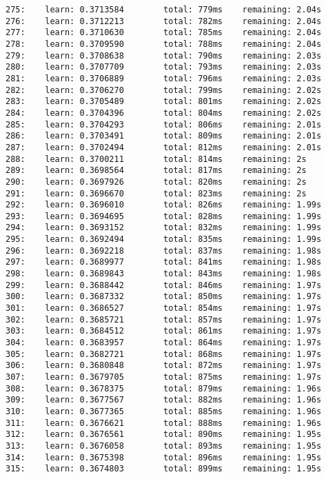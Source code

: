\documentclass[11pt]{article}
\begin{document}
\begin{Verbatim}[commandchars=\\\{\}]
275:    learn: 0.3713584        total: 779ms    remaining: 2.04s
276:    learn: 0.3712213        total: 782ms    remaining: 2.04s
277:    learn: 0.3710630        total: 785ms    remaining: 2.04s
278:    learn: 0.3709590        total: 788ms    remaining: 2.04s
279:    learn: 0.3708638        total: 790ms    remaining: 2.03s
280:    learn: 0.3707709        total: 793ms    remaining: 2.03s
281:    learn: 0.3706889        total: 796ms    remaining: 2.03s
282:    learn: 0.3706270        total: 799ms    remaining: 2.02s
283:    learn: 0.3705489        total: 801ms    remaining: 2.02s
284:    learn: 0.3704396        total: 804ms    remaining: 2.02s
285:    learn: 0.3704293        total: 806ms    remaining: 2.01s
286:    learn: 0.3703491        total: 809ms    remaining: 2.01s
287:    learn: 0.3702494        total: 812ms    remaining: 2.01s
288:    learn: 0.3700211        total: 814ms    remaining: 2s
289:    learn: 0.3698564        total: 817ms    remaining: 2s
290:    learn: 0.3697926        total: 820ms    remaining: 2s
291:    learn: 0.3696670        total: 823ms    remaining: 2s
292:    learn: 0.3696010        total: 826ms    remaining: 1.99s
293:    learn: 0.3694695        total: 828ms    remaining: 1.99s
294:    learn: 0.3693152        total: 832ms    remaining: 1.99s
295:    learn: 0.3692494        total: 835ms    remaining: 1.99s
296:    learn: 0.3692218        total: 837ms    remaining: 1.98s
297:    learn: 0.3689977        total: 841ms    remaining: 1.98s
298:    learn: 0.3689843        total: 843ms    remaining: 1.98s
299:    learn: 0.3688442        total: 846ms    remaining: 1.97s
300:    learn: 0.3687332        total: 850ms    remaining: 1.97s
301:    learn: 0.3686527        total: 854ms    remaining: 1.97s
302:    learn: 0.3685721        total: 857ms    remaining: 1.97s
303:    learn: 0.3684512        total: 861ms    remaining: 1.97s
304:    learn: 0.3683957        total: 864ms    remaining: 1.97s
305:    learn: 0.3682721        total: 868ms    remaining: 1.97s
306:    learn: 0.3680848        total: 872ms    remaining: 1.97s
307:    learn: 0.3679705        total: 875ms    remaining: 1.97s
308:    learn: 0.3678375        total: 879ms    remaining: 1.96s
309:    learn: 0.3677567        total: 882ms    remaining: 1.96s
310:    learn: 0.3677365        total: 885ms    remaining: 1.96s
311:    learn: 0.3676621        total: 888ms    remaining: 1.96s
312:    learn: 0.3676561        total: 890ms    remaining: 1.95s
313:    learn: 0.3676058        total: 893ms    remaining: 1.95s
314:    learn: 0.3675398        total: 896ms    remaining: 1.95s
315:    learn: 0.3674803        total: 899ms    remaining: 1.95s

\end{Verbatim}
\end{document}
